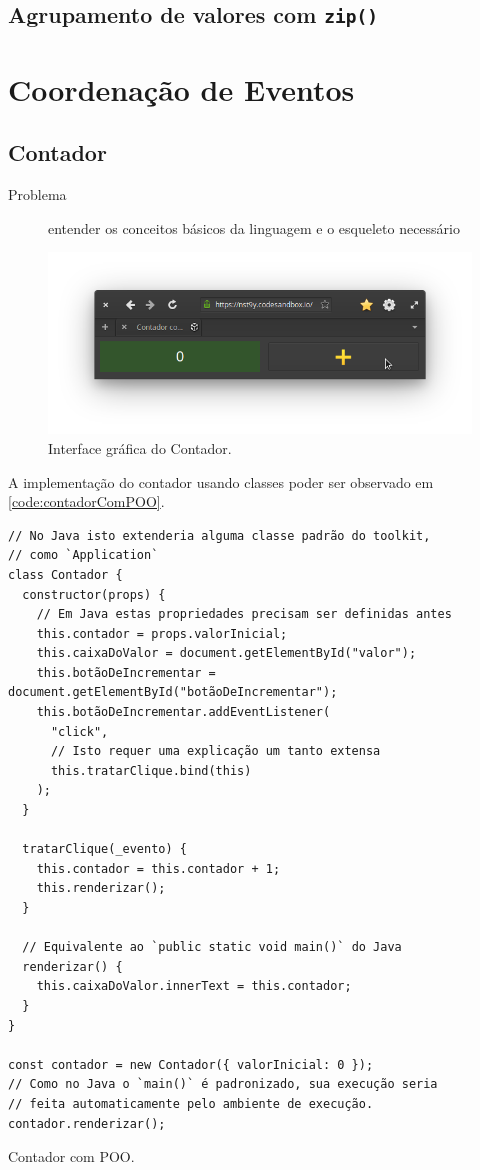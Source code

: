\subsection{Agrupamento de valores com \texttt{zip()}}
\label{sec:org03470bc}

\section{Coordenação de Eventos}
\label{sec:org67a7765}
\subsection{Contador}
\label{sec:org96cdecc}

\begin{description}
\item[{Problema}] entender os conceitos básicos da linguagem e o esqueleto
necessário
\end{description}

\begin{figure}[htbp]
\centering
\includegraphics[width=12cm]{./fig/screenshot-contador-epiphany.png}
\caption{\label{img:contador}Interface gráfica do Contador.}
\end{figure}

A implementação do contador usando classes poder ser observado em
\ref{code:contadorComPOO}.

\begin{listing}[htbp]
\begin{verbatim}
// No Java isto extenderia alguma classe padrão do toolkit,
// como `Application`
class Contador {
  constructor(props) {
    // Em Java estas propriedades precisam ser definidas antes
    this.contador = props.valorInicial;
    this.caixaDoValor = document.getElementById("valor");
    this.botãoDeIncrementar = document.getElementById("botãoDeIncrementar");
    this.botãoDeIncrementar.addEventListener(
      "click",
      // Isto requer uma explicação um tanto extensa
      this.tratarClique.bind(this)
    );
  }

  tratarClique(_evento) {
    this.contador = this.contador + 1;
    this.renderizar();
  }

  // Equivalente ao `public static void main()` do Java
  renderizar() {
    this.caixaDoValor.innerText = this.contador;
  }
}

const contador = new Contador({ valorInicial: 0 });
// Como no Java o `main()` é padronizado, sua execução seria
// feita automaticamente pelo ambiente de execução.
contador.renderizar();
\end{verbatim}
\caption{\label{code:contadorComPOO}Contador com POO.}
\end{listing}

